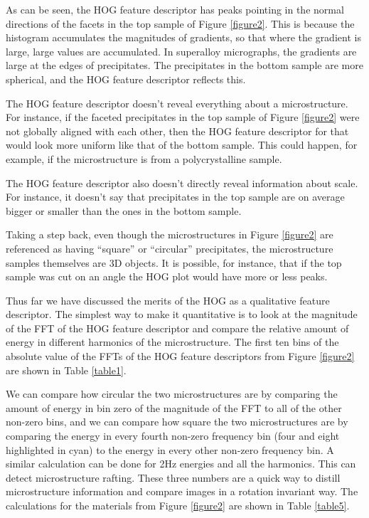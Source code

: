 \documentclass[review]{elsarticle}
\begin{document}
	As can be seen, the HOG feature descriptor has peaks pointing in the normal directions of the facets in the top sample of Figure \ref{figure2}. This is because the histogram accumulates the magnitudes of gradients, so that where the gradient is large, large values are accumulated. In superalloy micrographs, the gradients are large at the edges of precipitates. The precipitates in the bottom sample are more spherical, and the HOG feature descriptor reflects this.
	
	The HOG feature descriptor doesn't reveal everything about a microstructure. For instance, if the faceted precipitates in the top sample of Figure \ref{figure2} were not globally aligned with each other, then the HOG feature descriptor for that would look more uniform like that of the bottom sample. This could happen, for example, if the microstructure is from a polycrystalline sample.
	
	The HOG feature descriptor also doesn't directly reveal information about scale. For instance, it doesn't say that precipitates in the top sample are on average bigger or smaller than the ones in the bottom sample.
	
	Taking a step back, even though the microstructures in Figure \ref{figure2} are referenced as having ``square'' or ``circular'' precipitates, the microstructure samples themselves are 3D objects. It is possible, for instance, that if the top sample was cut on an angle the HOG plot would have more or less peaks.

	Thus far we have discussed the merits of the HOG as a qualitative feature descriptor. The simplest way to make it quantitative is to look at the magnitude of the FFT of the HOG feature descriptor and compare the relative amount of energy in different harmonics of the microstructure. The first ten bins of the absolute value of the FFTs of the HOG feature descriptors from Figure \ref{figure2} are shown in Table \ref{table1}.
	
  	We can compare how circular the two microstructures are by comparing the amount of energy in bin zero of the magnitude of the FFT to all of the other non-zero bins, and we can compare how square the two microstructures are by comparing the energy in every fourth non-zero frequency bin (four and eight highlighted in cyan) to the energy in every other non-zero frequency bin. A similar calculation can be done for 2Hz energies and all the harmonics. This can detect microstructure rafting. These three numbers are a quick way to distill microstructure information and compare images in a rotation invariant way. The calculations for the materials from Figure \ref{figure2} are shown in Table \ref{table5}.
	
\end{document}
